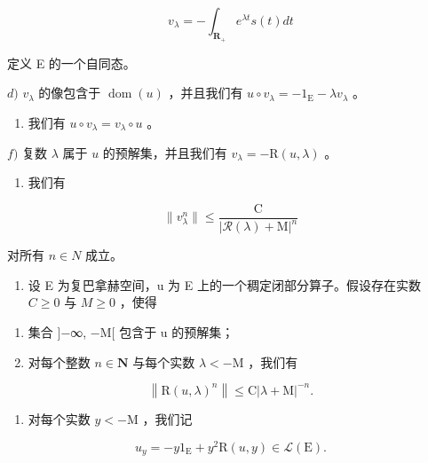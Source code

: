 \[
v _ {\lambda} = - \int_ {\mathbf {R} _ {+}} e ^ {\lambda t} s (t) d t
\]

定义 E 的一个自同态。

\(d)\) \(v_{\lambda}\) 的像包含于 \(\operatorname{dom}(u)\) ，并且我们有 \(u \circ v_{\lambda} = -1_{\mathrm{E}} - \lambda v_{\lambda}\) 。

\begin{enumerate}
\def\labelenumi{\alph{enumi})}
\setcounter{enumi}{4}
\tightlist
\item
  我们有 \(u \circ v_{\lambda} = v_{\lambda} \circ u\) 。
\end{enumerate}

\(f)\) 复数 \(\lambda\) 属于 \(u\) 的预解集，并且我们有 \(v_{\lambda} = -\mathrm{R}(u,\lambda)\) 。

\begin{enumerate}
\def\labelenumi{\alph{enumi})}
\setcounter{enumi}{6}
\tightlist
\item
  我们有
\end{enumerate}

\[
\| v _ {\lambda} ^ {n} \| \leqslant \frac {\mathrm{C}}{| \mathcal {R} (\lambda) + \mathrm{M} | ^ {n}}
\]

对所有 \(n \in N\) 成立。

\begin{enumerate}
\def\labelenumi{\arabic{enumi})}
\setcounter{enumi}{5}
\tightlist
\item
  设 E 为复巴拿赫空间，u 为 E 上的一个稠定闭部分算子。假设存在实数 \(C \geqslant 0\) 与 \(M \geqslant 0\) ，使得
\end{enumerate}

\begin{enumerate}
\def\labelenumi{(\roman{enumi})}
\item
  集合 {]}−∞, −M{[} 包含于 u 的预解集；
\item
  对每个整数 \(n \in \mathbf{N}\) 与每个实数 \(\lambda < -\mathrm{M}\) ，我们有
\end{enumerate}

\[
\left\| \mathrm{R} (u, \lambda) ^ {n} \right\| \leqslant \mathrm{C} | \lambda + \mathrm{M} | ^ {- n}.
\]

\begin{enumerate}
\def\labelenumi{\alph{enumi})}
\tightlist
\item
  对每个实数 \(y < -\mathrm{M}\) ，我们记
\end{enumerate}

\[
u _ {y} = - y 1 _ {\mathrm{E}} + y ^ {2} \mathrm{R} (u, y) \in \mathcal {L} (\mathrm{E}).
\]

